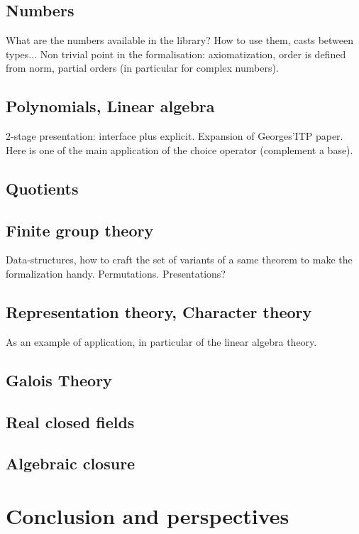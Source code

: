 \documentclass{book}
\begin{document}
\chapter{Numbers}

What are the numbers available in the library? How to use them, casts
between types... Non trivial point in the formalisation:
axiomatization, order is defined from norm, partial orders (in
particular for complex numbers).


\chapter{Polynomials, Linear algebra}

2-stage presentation: interface plus explicit. Expansion of
Georges'ITP paper. Here is one of the main application of the choice
operator (complement a base).

\chapter{Quotients}

\chapter{Finite group theory}

Data-structures, how to craft the set of variants of a same theorem to
make the formalization handy. Permutations. Presentations?

\chapter{Representation theory, Character theory}

As an example of application, in particular of the linear algebra
theory.

\chapter{Galois Theory}


\chapter{Real closed fields}

\chapter{Algebraic closure}

\part{Conclusion and perspectives}
\end{document}
